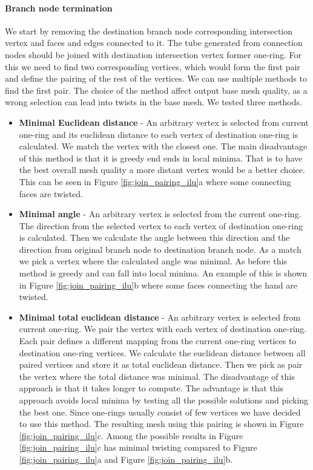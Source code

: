 \paragraph{Branch node termination}
We start by removing the destination branch node corresponding intersection vertex and faces and edges connected to it. The tube generated from connection nodes should be joined with destination intersection vertex former one-ring. For this we need to find two corresponding vertices, which would form the first pair and define the pairing of the rest of the vertices. We can use multiple methods to find the first pair. The choice of the method affect output base mesh quality, as a wrong selection can lead into twists in the base mesh. We tested three methods.
\begin{itemize}
	\itemsep-0.25em 
	\item \textbf{Minimal Euclidean distance} - An arbitrary vertex is selected from current one-ring and its euclidean distance to each vertex of destination one-ring is calculated. We match the vertex with the closest one. The main disadvantage of this method is that it is greedy end ends in local minima. That is to have the best overall mesh quality a more distant vertex would be a better choice. This can be seen in Figure \ref{fig:join_pairing_ilu}a where some connecting faces are twisted.
	\item \textbf{Minimal angle} - An arbitrary vertex is selected from the current one-ring. The direction from the selected vertex to each vertex of destination one-ring is calculated. Then we calculate the angle between this direction and the direction from original branch node to destination branch node. As a match we pick a vertex where the calculated angle was minimal. As before this method is greedy and can fall into local minima. An example of this is shown in Figure \ref{fig:join_pairing_ilu}b where some faces connecting the hand are twisted.
	\item \textbf{Minimal total euclidean distance} - An arbitrary vertex is selected from current one-ring. We pair the vertex with each vertex of destination one-ring. Each pair defines a different mapping from the current one-ring vertices to destination one-ring vertices. We calculate the euclidean distance between all paired vertices and store it as total euclidean distance. Then we pick as pair the vertex where the total distance was minimal. The disadvantage of this approach is that it takes longer to compute. The advantage is that this approach avoids local minima by testing all the possible solutions and picking the best one. Since one-rings usually consist of few vertices we have decided to use this method. The resulting mesh using this pairing is shown in Figure \ref{fig:join_pairing_ilu}c. Among the possible results in Figure \ref{fig:join_pairing_ilu}c has minimal twisting compared to Figure \ref{fig:join_pairing_ilu}a and Figure \ref{fig:join_pairing_ilu}b. 
\end{itemize}

